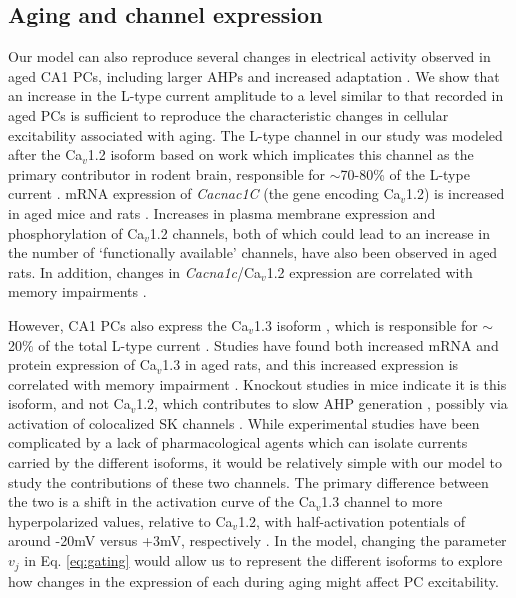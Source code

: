 \documentclass[12pt]{article}
\begin{document}
\subsection{Aging and {\Ca} channel expression}
Our model can also reproduce several changes in electrical activity observed in aged CA1 PCs, including larger AHPs \citep{kumar200217beta,kumar2007environmental,landfield1984prolonged,gant2009action,power2002age} and increased adaptation \citep{gant2006early,moyer1992nimodipine,tombaugh2005slow}. We show that an increase in the L-type {\Ca} current amplitude 
to a level similar to that recorded in aged PCs is sufficient to reproduce the characteristic changes in cellular excitability associated with aging. The L-type channel in our study was modeled after the Ca$_v$1.2 isoform based on work which implicates this channel as the primary contributor in rodent brain, responsible for $\sim$70-80\% of the L-type current \cite{hell1993identification,sinnegger2004isoform}. mRNA expression of \textit{Cacnac1C} (the gene encoding Ca$_v$1.2) is increased in aged mice and rats \cite{herman1998up,zanos2015sex}. Increases in plasma membrane expression \cite{nunez2014surface} and phosphorylation \cite{davare2003increased} of Ca$_v$1.2 channels, both of which could lead to an increase in the number of `functionally available' channels, have also been observed in aged rats. In addition, changes in \textit{Cacna1c}/Ca$_v$1.2 expression are correlated with memory impairments \cite{moosmang2005role,zanos2015sex}.

However, CA1 PCs also express the Ca$_v$1.3 isoform \cite{bowden2001somatic}, which is responsible for $\sim$20\% of the total L-type current \cite{hell1993identification,sinnegger2004isoform}. Studies have found both increased mRNA \cite{herman1998up} and protein \cite{veng2002regionally} expression of Ca$_v$1.3 in aged rats, and this increased expression is correlated with memory impairment \cite{veng2003age}. Knockout studies in mice indicate it is this isoform, and not Ca$_v$1.2, which contributes to slow AHP generation \citep{gamelli2011deletion}, possibly via activation of colocalized SK channels \cite{bowden2001somatic}. While experimental studies have been complicated by a lack of pharmacological agents which can isolate currents carried by the different isoforms, it would be relatively simple with our model to study the contributions of these two channels. The primary difference between the two is a shift in the activation curve of the Ca$_v$1.3 channel to more hyperpolarized values, relative to Ca$_v$1.2, with half-activation potentials of around -20mV versus +3mV, respectively \citep{xu2001neuronal}. In the model, changing the parameter $v_j$ in Eq. \ref{eq:gating} would allow us to represent the different isoforms to explore how changes in the expression of each during aging might affect PC excitability.  
\end{document}
